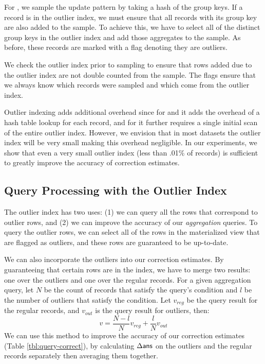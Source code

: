 For \aggview, we sample the update pattern by taking a hash of the group keys.
If a record is in the outlier index, we must ensure that all records with its group key are also added to the sample.
To achieve this, we have to select all of the distinct group keys in the outlier index and add those aggregates to the sample.
As before, these records are marked with a flag denoting they are outliers.

We check the outlier index prior to sampling to ensure that rows added due to the outlier index are not double counted from the sample.
The flags ensure that we always know which records were sampled and which come from the outlier index.

Outlier indexing adds additional overhead since for \spview and \fjview it adds the overhead of a hash table lookup for each record, and for \aggview it further requires a single initial scan of the entire outlier index. 
However, we envision that in most datasets the outlier index will be very small making this overhead negligible.
In our experiments, we show that even a very small outlier index (less than .01\% of records) is sufficient to greatly improve the accuracy of
correction estimates.

\subsection{Query Processing with the Outlier Index} 
The outlier index has two uses: (1) we can query all the rows that correspond to outlier rows, 
and (2) we can improve the accuracy of our \emph{aggregation} queries.
To query the outlier rows, we can select all of the rows in the materialized view that are flagged as outliers, and these rows are guaranteed to be up-to-date.

We can also incorporate the outliers into our correction estimates.  
By guaranteeing that certain rows are in the index, we
have to merge two results: one over the outliers and one over the regular records.
For a given aggregation query, let $N$ be the count of records that satisfy the query's condition and $l$ be the number of outliers that satisfy the condition.
Let $v_{reg}$ be the query result for the regular records, and $v_{out}$ is the query result for outliers, then:
\[
 v = \frac{N-l}{N}v_{reg} + \frac{l}{N}v_{out}
\]
We can use this method to improve the accuracy of our correction estimates (Table \ref{tbl:query-correct}), by calculating $\Delta\textsf{ans}$ 
on the outliers and the regular records separately then averaging them together. 
